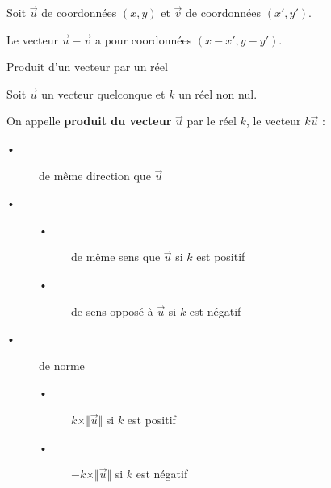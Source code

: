 \begin{Th}

Soit $\overrightarrow{u}$ de coordonnées $(x,y)$ et $\overrightarrow{v}$ de coordonnées $(x',y')$.

Le vecteur  $\overrightarrow{u}-\overrightarrow{v}$ a pour coordonnées $(x-x',y-y')$.
\end{Th}


\begin{DefT}{Produit d'un vecteur par un réel}
\begin{minipage}{0.48\linewidth}
Soit $\overrightarrow{u}$ un vecteur quelconque et $k$ un réel non nul.

On appelle \textbf{produit du vecteur} $\overrightarrow{u}$ par le réel $k$, le vecteur $k\overrightarrow{u}$ :
\begin{description}
\item[•] de même direction que $\overrightarrow{u}$
\item[•] 
\begin{description}
\item[•] de même sens que $\overrightarrow{u}$ si $k$ est positif
\item[•] de sens opposé à $\overrightarrow{u}$ si $k$ est négatif
\end{description}
\item[•] de norme
\begin{description}
\item[•] $k \times \Vert \overrightarrow{u} \Vert$ si $k$ est positif
\item[•] $-k \times \Vert \overrightarrow{u} \Vert$ si $k$ est négatif
\end{description}

\end{description}

\end{minipage}
\hfill
\begin{minipage}{0.48\linewidth}


\end{minipage}
\end{DefT}


